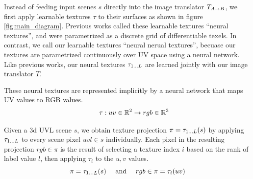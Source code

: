 \documentclass{article}
\begin{document}
	Instead of feeding input scenes $s$ directly into the image translator $T_{A\rightarrow B}$, we first apply learnable textures $\tau$ to their surfaces as shown in figure \ref{fig:main_diagram}.
	Previous works called these learnable textures ``neural textures'', and were parametrized as a discrete grid of differentiable texels. 
	In contrast, we call our learnable textures ``neural nerual textures'', becuase our textures are parametrized continuously over UV space using a neural network.
	Like previous works, our neural textures $\tau_{1\dots L}$ are learned jointly with our image translator $T$.
	
	These neural textures are represented implicitly by a neural network that maps UV values to RGB values.%
	\begin{equation}
		\qquad \tau: uv \in\real^2 \rightarrow rgb \in\real^3 %
	\end{equation}
	
	Given a 3d UVL scene $s$, we obtain texture projection $\pi=\tau_{1\dots L}(s)$ by applying $\tau_{1\dots L}$ to every scene pixel $uvl \in s$ individually.
	Each pixel in the resulting projection $rgb\in\pi$ is the result of selecting a texture index $i$ based on the rank of label value $l$, then applying $\tau_i$ to the $u,v$ values.
	\begin{equation}
		\pi=\tau_{1\dots L}(s) \ \ \ \text{ and }\ \ \  rgb \in \pi = \tau_i(uv)
	\end{equation}


	
			
\end{document}
